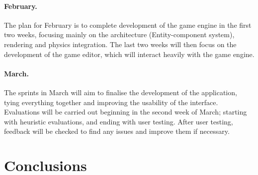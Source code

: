 \documentclass[a4paper, 12pt]{article}
\begin{document}
\paragraph{February.}
The plan for February is to complete development of the game engine in the first two weeks, focusing mainly on the architecture (Entity-component system), rendering and physics integration. The last two weeks will then focus on the development of the game editor, which will interact heavily with the game engine.

\paragraph{March.}
The sprints in March will aim to finalise the development of the application, tying everything together and improving the usability of the interface. Evaluations will be carried out beginning in the second week of March; starting with heuristic evaluations, and ending with user testing. After user testing, feedback will be checked to find any issues and improve them if necessary.

\section{Conclusions}
\end{document}
